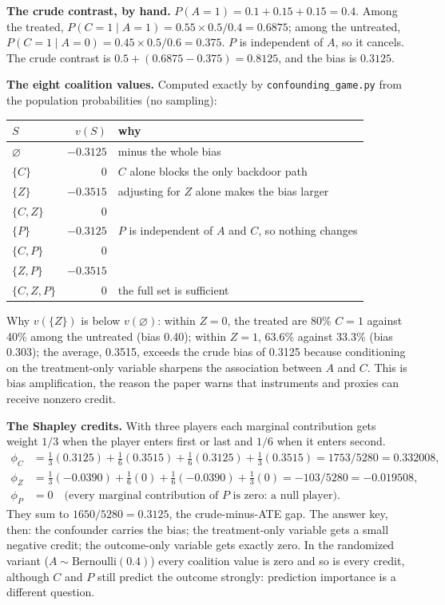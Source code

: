 \documentclass[10pt,letterpaper]{article}
\begin{document}
\textbf{The crude contrast, by hand.} $P(A=1) = 0.1 + 0.15 + 0.15 = 0.4$. Among the treated, $P(C=1 \mid A=1) = 0.55 \times 0.5 / 0.4 = 0.6875$; among the untreated, $P(C=1 \mid A=0) = 0.45 \times 0.5 / 0.6 = 0.375$. $P$ is independent of $A$, so it cancels. The crude contrast is $0.5 + (0.6875 - 0.375) = 0.8125$, and the bias is $0.3125$.

\textbf{The eight coalition values.} Computed exactly by \texttt{confounding\_game.py} from the population probabilities (no sampling):
\begin{center}
\begin{tabular}{@{}lrl@{}}
\toprule $S$ & $v(S)$ & why\\\midrule
$\varnothing$ & $-0.3125$ & minus the whole bias\\
$\{C\}$ & $0$ & $C$ alone blocks the only backdoor path\\
$\{Z\}$ & $-0.3515$ & adjusting for $Z$ alone makes the bias larger\\
$\{C,Z\}$ & $0$ & \\
$\{P\}$ & $-0.3125$ & $P$ is independent of $A$ and $C$, so nothing changes\\
$\{C,P\}$ & $0$ & \\
$\{Z,P\}$ & $-0.3515$ & \\
$\{C,Z,P\}$ & $0$ & the full set is sufficient\\
\bottomrule
\end{tabular}
\end{center}
Why $v(\{Z\})$ is below $v(\varnothing)$: within $Z=0$, the treated are 80\% $C=1$ against 40\% among the untreated (bias 0.40); within $Z=1$, 63.6\% against 33.3\% (bias 0.303); the average, 0.3515, exceeds the crude bias of 0.3125 because conditioning on the treatment-only variable sharpens the association between $A$ and $C$. This is bias amplification, the reason the paper warns that instruments and proxies can receive nonzero credit.

\textbf{The Shapley credits.} With three players each marginal contribution gets weight $1/3$ when the player enters first or last and $1/6$ when it enters second.
\begin{align*}
\phi_C &= \tfrac13(0.3125) + \tfrac16(0.3515) + \tfrac16(0.3125) + \tfrac13(0.3515) = 1753/5280 = 0.332008,\\
\phi_Z &= \tfrac13(-0.0390) + \tfrac16(0) + \tfrac16(-0.0390) + \tfrac13(0) = -103/5280 = -0.019508,\\
\phi_P &= 0 \quad\text{(every marginal contribution of $P$ is zero: a null player)}.
\end{align*}
They sum to $1650/5280 = 0.3125$, the crude-minus-ATE gap. The answer key, then: the confounder carries the bias; the treatment-only variable gets a small negative credit; the outcome-only variable gets exactly zero. In the randomized variant ($A \sim \text{Bernoulli}(0.4)$) every coalition value is zero and so is every credit, although $C$ and $P$ still predict the outcome strongly: prediction importance is a different question.
\end{document}
